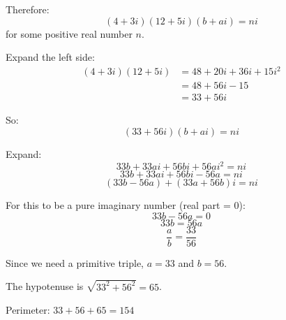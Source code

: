 \documentclass[12pt]{article}
\begin{document}
\begin{solutionbox}
Therefore:
$$(4 + 3i)(12 + 5i)(b + ai) = ni$$
for some positive real number $n$.

Expand the left side:
\begin{align*}
    (4 + 3i)(12 + 5i) &= 48 + 20i + 36i + 15i^2 \\
    &= 48 + 56i - 15 \\
    &= 33 + 56i
\end{align*}

So:
$$(33 + 56i)(b + ai) = ni$$

Expand:
$$33b + 33ai + 56bi + 56ai^2 = ni$$
$$33b + 33ai + 56bi - 56a = ni$$
$$(33b - 56a) + (33a + 56b)i = ni$$

For this to be a pure imaginary number (real part = 0):
$$33b - 56a = 0$$
$$33b = 56a$$
$$\frac{a}{b} = \frac{33}{56}$$

Since we need a primitive triple, $a = 33$ and $b = 56$.

The hypotenuse is $\sqrt{33^2 + 56^2} = 65$.

Perimeter: $33 + 56 + 65 = 154$

\end{solutionbox}
\end{document}
